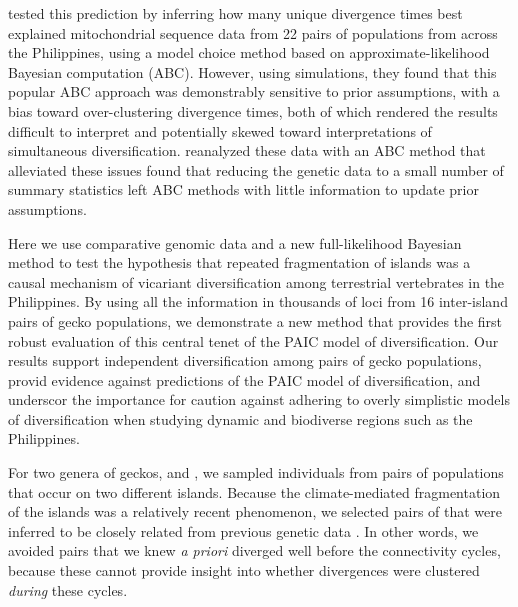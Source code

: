 \citet{Oaks2012}  tested this prediction  by inferring how many unique
divergence times best explained mitochondrial sequence data from 22 pairs of
populations from across the Philippines, using a model choice method based on
approximate-likelihood Bayesian computation (ABC).
However, using simulations, they found that this popular ABC approach was
demonstrably sensitive to prior assumptions, with a bias toward over-clustering
divergence times, both of which rendered the results difficult to interpret
and potentially skewed toward interpretations of simultaneous diversification.
\citet{Oaks2014dpp} reanalyzed these data with an ABC method that alleviated
these issues found that reducing the genetic data to a small
number of summary statistics left ABC methods with little information to update
prior assumptions.

Here we use comparative genomic data and a new full-likelihood Bayesian method
to test the hypothesis that repeated fragmentation of islands was a causal
mechanism of vicariant diversification among terrestrial vertebrates in the
Philippines.
By using all the information in thousands of loci from 16 inter-island
pairs of gecko populations,
we demonstrate a new method that provides the first robust evaluation of
this central tenet of the PAIC model of diversification.
Our results support independent diversification among pairs of gecko
populations,
provid evidence against  predictions of
the PAIC model of diversification,
and underscor the importance for caution against adhering to
overly simplistic models of diversification  when studying dynamic and biodiverse regions such as the
Philippines.



For two genera of geckos,  and , we sampled
individuals from pairs of populations that occur on two different islands.
Because the climate-mediated fragmentation of the islands was a relatively
recent phenomenon, we selected  pairs of
 that were inferred to be closely related
from previous genetic data
\citep{Siler2010, Siler2012, Siler2014kikuchii, Welton2010zootaxa, Welton2010}.
In other words, we avoided pairs that we knew \emph{a priori} diverged well
before the connectivity cycles, because these cannot provide insight into
whether divergences were clustered \emph{during} these cycles.


